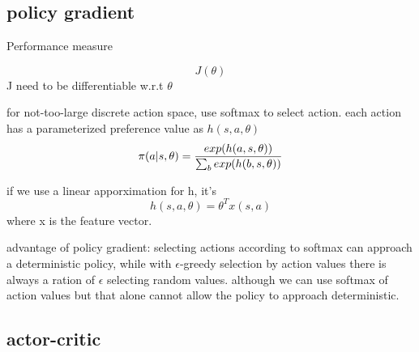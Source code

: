 \documentclass[10pt,a4paper]{book}
\begin{document}
\subsection {policy gradient}
Performance measure

$$J(\theta)$$
J need to be differentiable w.r.t $\theta$

for not-too-large discrete action space, use softmax to select action. each action has a parameterized preference value as $h(s,a,\theta)$
$$\pi(a|s,\theta) = {{exp(h(a,s,\theta))}\over{\sum_b{exp(h(b,s,\theta))}}}$$

if we use a linear apporximation for h, it's
$$h(s,a,\theta) = \theta^Tx(s,a)$$
where x is the feature vector.

advantage of policy gradient: selecting actions according to softmax can approach a deterministic policy, while with $\epsilon$-greedy selection by action values there is always a ration of $\epsilon$ selecting random values.
although we can use softmax of action values but that alone cannot allow the policy to approach deterministic.

\subsection {actor-critic}
\end{document}
